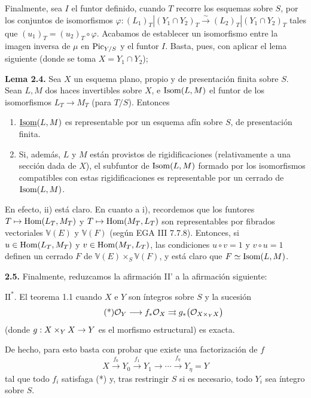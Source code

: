Finalmente, sea \(I\) el funtor definido, cuando \(T\) recorre los esquemas
sobre \(S\), por los conjuntos de isomorfismos
\(\varphi:(L_1)_T|(Y_1\cap Y_2)_T\xrightarrow{\sim}(L_2)_T|(Y_1\cap Y_2)_T\)
tales que \((u_1)_T=(u_2)_T\circ\varphi\). Acabamos de establecer un
isomorfismo entre la imagen inversa de \(\mu\) en \(\Pic_{Y/S}\) y el funtor
\(I\). Basta, pues, con aplicar el lema siguiente (donde se toma
\(X=Y_1\cap Y_2\));

\textbf{Lema 2.4.} Sea \(X\) un esquema plano, propio y de presentación
finita sobre \(S\). Sean \(L,M\) dos haces invertibles sobre \(X\), e
\(\Isom(L,M)\) el funtor de los isomorfismos \(L_T\to M_T\) (para \(T/S\)).
Entonces
\begin{enumerate}[label=\roman*)]
\item \(\underline{\Isom}(L,M)\) es representable por un esquema afín sobre \(S\), de
presentación finita.
\item Si, además, \(L\) y \(M\) están provistos de rigidificaciones
(relativamente a una sección dada de \(X\)), el subfuntor de \(\Isom(L,M)\)
formado por los isomorfismos compatibles con estas rigidificaciones es
representable por un cerrado de \(\Isom(L,M)\).
\end{enumerate}
En efecto, ii) está claro. En cuanto a i), recordemos que los funtores
\(T\mapsto\Hom(L_T,M_T)\) y \(T\mapsto\Hom(M_T,L_T)\) son representables por
fibrados vectoriales \(\mathbb V(E)\) y \(\mathbb V(F)\) (según EGA III
7.7.8). Entonces, si \(u\in\Hom(L_T,M_T)\) y
\(v\in\Hom(M_T,L_T)\), las condiciones \(u\circ v=1\) y \(v\circ u=1\)
definen un cerrado \(F\) de \(\mathbb V(E)\times_S\mathbb V(F)\), y está
claro que \(F\simeq \sisi{I}{\Isom(L,M)}\). %

\textbf{2.5.} Finalmente, reduzcamos la afirmación II' a la afirmación
siguiente:

\(\mathrm{II}^*\). El teorema 1.1 cuando \(X\) e \(Y\) son íntegros sobre
\(S\) y la sucesión
\begin{equation}\tag{*}
  \mathcal O_Y
  \longrightarrow f_*\sisi{\mathcal O_Y}{\mathcal O_X} %
  \rightrightarrows g_*\bigl(\mathcal O_{X\times_{\sisi{y}{Y}}X}\bigr)
\end{equation}
(donde \(g:X\times_{\sisi{y}{Y}}X\to Y\) es el morfismo estructural) es exacta.

De hecho, para esto basta con probar que existe una factorización de \(f\)
\[
  X\xrightarrow{f_0}Y_0\xrightarrow{f_1}Y_1\longrightarrow\cdots\xrightarrow{f_\eta}Y_\eta=Y
\]
tal que todo \(f_i\) satisfaga (*) y, tras restringir \(S\) si es necesario,
todo \(Y_i\) sea íntegro sobre \(S\).

